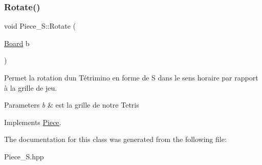 \mbox{\label{classPiece__S_aefb2837f39f6b05bc678a3fdadc192b0}} 
\subsubsection{\texorpdfstring{Rotate()}{Rotate()}}
{\footnotesize\ttfamily void Piece\+\_\+\+S\+::\+Rotate (\begin{DoxyParamCaption}\item[{\hyperlink{classBoard}{Board}}]{b }\end{DoxyParamCaption})\hspace{0.3cm}{\ttfamily [virtual]}}



Permet la rotation d\textquotesingle{}un Tétrimino en forme de S dans le sens horaire par rapport à la grille de jeu. 


\begin{DoxyParams}{Parameters}
{\em b} & est la grille de notre Tetris \\
\hline
\end{DoxyParams}


Implements \hyperlink{classPiece_a078f3cc6281cb8f60af3ae2266c651ba}{Piece}.



The documentation for this class was generated from the following file\+:\begin{DoxyCompactItemize}
\item 
Piece\+\_\+\+S.\+hpp\end{DoxyCompactItemize}
